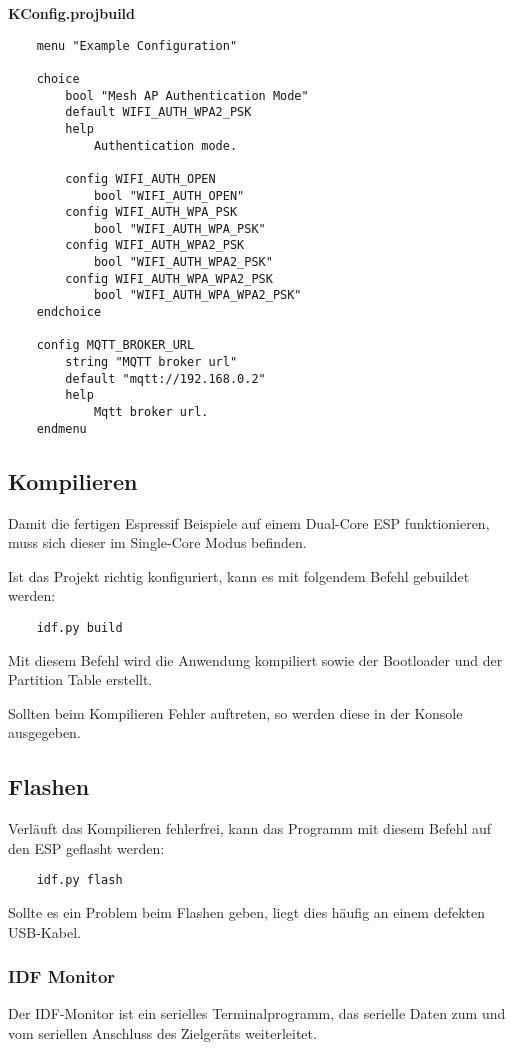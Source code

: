\pagebreak
\textbf{KConfig.projbuild}
\begin{verbatim}
    menu "Example Configuration"

    choice
        bool "Mesh AP Authentication Mode"
        default WIFI_AUTH_WPA2_PSK
        help
            Authentication mode.

        config WIFI_AUTH_OPEN
            bool "WIFI_AUTH_OPEN"
        config WIFI_AUTH_WPA_PSK
            bool "WIFI_AUTH_WPA_PSK"
        config WIFI_AUTH_WPA2_PSK
            bool "WIFI_AUTH_WPA2_PSK"
        config WIFI_AUTH_WPA_WPA2_PSK
            bool "WIFI_AUTH_WPA_WPA2_PSK"
    endchoice

    config MQTT_BROKER_URL
        string "MQTT broker url"
        default "mqtt://192.168.0.2"
        help
            Mqtt broker url.
    endmenu
\end{verbatim}

\subsection{Kompilieren}
Damit die fertigen Espressif Beispiele auf einem Dual-Core ESP funktionieren, muss sich dieser im Single-Core Modus befinden.

Ist das Projekt richtig konfiguriert, kann es mit folgendem Befehl gebuildet werden:
\begin{verbatim}
    idf.py build
\end{verbatim}

Mit diesem Befehl wird die Anwendung kompiliert sowie der Bootloader und der Partition Table erstellt.

Sollten beim Kompilieren Fehler auftreten, so werden diese in der Konsole ausgegeben.

\subsection{Flashen}
Verläuft das Kompilieren fehlerfrei, kann das Programm mit diesem Befehl auf den ESP geflasht werden:
\begin{verbatim}
    idf.py flash
\end{verbatim}

Sollte es ein Problem beim Flashen geben, liegt dies häufig an einem defekten USB-Kabel.

\subsubsection{IDF Monitor}\label{sec:monitor}
Der IDF-Monitor ist ein serielles Terminalprogramm, das serielle Daten zum und vom seriellen Anschluss des Zielgeräts weiterleitet.

